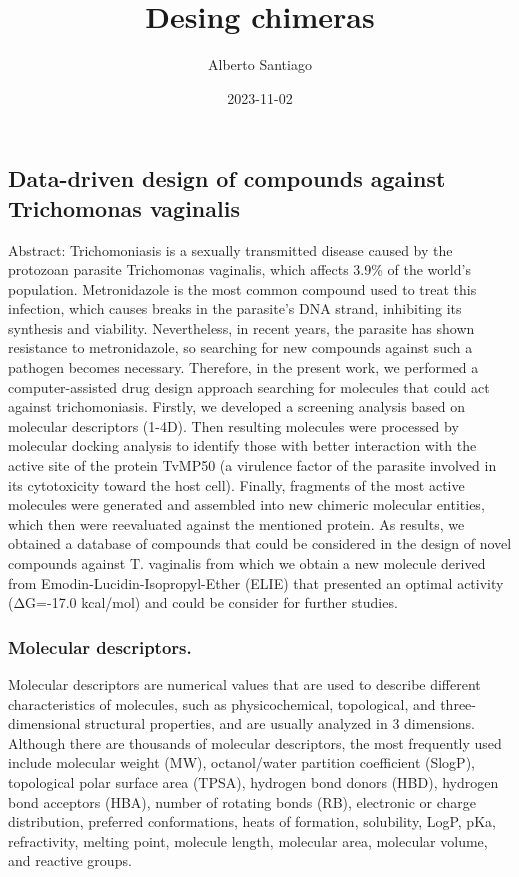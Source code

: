 \documentclass[
]{article}
\title{Desing chimeras}
\author{Alberto Santiago}
\date{2023-11-02}
\begin{document}
\maketitle

\hypertarget{data-driven-design-of-compounds-against-trichomonas-vaginalis}{%
\subsection{Data-driven design of compounds against Trichomonas
vaginalis}\label{data-driven-design-of-compounds-against-trichomonas-vaginalis}}

Abstract: Trichomoniasis is a sexually transmitted disease caused by the
protozoan parasite Trichomonas vaginalis, which affects 3.9\% of the
world's population. Metronidazole is the most common compound used to
treat this infection, which causes breaks in the parasite's DNA strand,
inhibiting its synthesis and viability. Nevertheless, in recent years,
the parasite has shown resistance to metronidazole, so searching for new
compounds against such a pathogen becomes necessary. Therefore, in the
present work, we performed a computer-assisted drug design approach
searching for molecules that could act against trichomoniasis. Firstly,
we developed a screening analysis based on molecular descriptors (1-4D).
Then resulting molecules were processed by molecular docking analysis to
identify those with better interaction with the active site of the
protein TvMP50 (a virulence factor of the parasite involved in its
cytotoxicity toward the host cell). Finally, fragments of the most
active molecules were generated and assembled into new chimeric
molecular entities, which then were reevaluated against the mentioned
protein. As results, we obtained a database of compounds that could be
considered in the design of novel compounds against T. vaginalis from
which we obtain a new molecule derived from
Emodin-Lucidin-Isopropyl-Ether (ELIE) that presented an optimal activity
(ΔG=-17.0 kcal/mol) and could be consider for further studies.

\hypertarget{molecular-descriptors.}{%
\subsubsection{Molecular descriptors.}\label{molecular-descriptors.}}

Molecular descriptors are numerical values that are used to describe
different characteristics of molecules, such as physicochemical,
topological, and three-dimensional structural properties, and are
usually analyzed in 3 dimensions. Although there are thousands of
molecular descriptors, the most frequently used include molecular weight
(MW), octanol/water partition coefficient (SlogP), topological polar
surface area (TPSA), hydrogen bond donors (HBD), hydrogen bond acceptors
(HBA), number of rotating bonds (RB), electronic or charge distribution,
preferred conformations, heats of formation, solubility, LogP, pKa,
refractivity, melting point, molecule length, molecular area, molecular
volume, and reactive groups.
\end{document}
